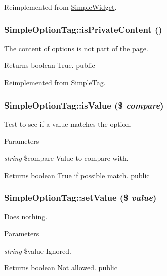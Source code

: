 Reimplemented from \hyperlink{class_simple_widget_a9c0702cdfee1237b1599cb920ce14ba6}{SimpleWidget}.\hypertarget{class_simple_option_tag_a94df0c09858c39d2a3e486e70bdbfcfa}{
\subsubsection[{isPrivateContent}]{\setlength{\rightskip}{0pt plus 5cm}SimpleOptionTag::isPrivateContent ()}}
\label{class_simple_option_tag_a94df0c09858c39d2a3e486e70bdbfcfa}
The content of options is not part of the page. \begin{DoxyReturn}{Returns}
boolean True.  public 
\end{DoxyReturn}


Reimplemented from \hyperlink{class_simple_tag_a6f1d7a187565b366e995d94da0f16ad4}{SimpleTag}.\hypertarget{class_simple_option_tag_a616ac658cde8ca47c8f74b7baf21310c}{
\subsubsection[{isValue}]{\setlength{\rightskip}{0pt plus 5cm}SimpleOptionTag::isValue (\$ {\em compare})}}
\label{class_simple_option_tag_a616ac658cde8ca47c8f74b7baf21310c}
Test to see if a value matches the option. 
\begin{DoxyParams}{Parameters}
\item[{\em string}]\$compare Value to compare with. \end{DoxyParams}
\begin{DoxyReturn}{Returns}
boolean True if possible match.  public 
\end{DoxyReturn}
\hypertarget{class_simple_option_tag_ab8296c8c864cb50ab4e43fe58caa3576}{
\subsubsection[{setValue}]{\setlength{\rightskip}{0pt plus 5cm}SimpleOptionTag::setValue (\$ {\em value})}}
\label{class_simple_option_tag_ab8296c8c864cb50ab4e43fe58caa3576}
Does nothing. 
\begin{DoxyParams}{Parameters}
\item[{\em string}]\$value Ignored. \end{DoxyParams}
\begin{DoxyReturn}{Returns}
boolean Not allowed.  public 
\end{DoxyReturn}


